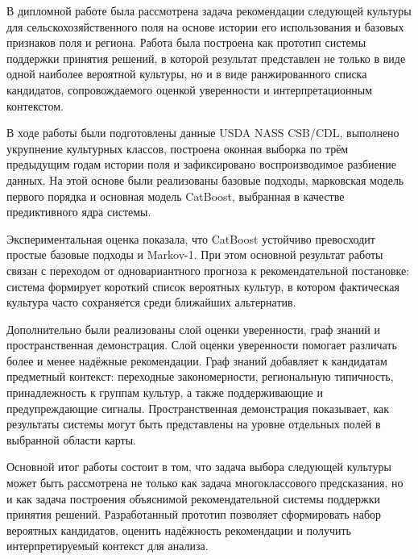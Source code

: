 
В дипломной работе была рассмотрена задача рекомендации следующей культуры для сельскохозяйственного поля на основе
истории его использования и базовых признаков поля и региона. Работа была построена как прототип системы поддержки
принятия решений, в которой результат представлен не только в виде
одной наиболее вероятной культуры, но и в виде ранжированного списка кандидатов, сопровождаемого оценкой уверенности и
интерпретационным контекстом.

В ходе работы были подготовлены данные USDA NASS CSB/CDL, выполнено укрупнение культурных классов, построена оконная
выборка по трём предыдущим годам истории поля и зафиксировано воспроизводимое разбиение данных. На этой основе были
реализованы базовые подходы, марковская модель первого порядка и основная модель CatBoost, выбранная в качестве
предиктивного ядра системы.

Экспериментальная оценка показала, что CatBoost устойчиво превосходит простые базовые подходы и Markov-1. При этом
основной результат работы связан с переходом от одновариантного прогноза к рекомендательной постановке: система формирует
короткий список вероятных культур, в котором фактическая культура часто сохраняется среди ближайших альтернатив.

Дополнительно были реализованы слой оценки уверенности, граф знаний и пространственная демонстрация. Слой оценки
уверенности помогает различать более и менее надёжные рекомендации. Граф знаний добавляет к кандидатам предметный
контекст: переходные закономерности, региональную типичность, принадлежность к группам культур, а также поддерживающие и
предупреждающие сигналы. Пространственная демонстрация показывает, как результаты системы могут быть представлены на
уровне отдельных полей в выбранной области карты.

Основной итог работы состоит в том, что задача выбора следующей культуры может быть рассмотрена не только как задача
многоклассового предсказания, но и как задача построения объяснимой рекомендательной системы поддержки принятия решений.
Разработанный прототип позволяет сформировать набор вероятных кандидатов, оценить надёжность рекомендации и получить
интерпретируемый контекст для анализа.